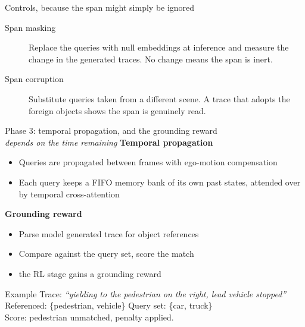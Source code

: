 \documentclass[aspectratio=169,11pt,t]{beamer}
\begin{document}
\begin{frame}{Controls, because the span might simply be ignored}
  \vspace{0.7em}
  \begin{description}
    \item[Span masking] Replace the queries with null embeddings at
      inference and measure the change in the generated traces. No change means
      the span is inert.
    \item[Span corruption] Substitute queries taken from a different scene. A
      trace that adopts the foreign objects shows the span is genuinely read.
  \end{description}
\end{frame}


\begin{frame}{Phase 3: temporal propagation, and the grounding reward \\
  \hfill\normalfont\footnotesize\itshape depends on the time remaining}
  \small
  \vspace{-0.5em}
  \textbf{Temporal propagation}
  \begin{itemize}
    \item Queries are propagated between frames with ego-motion compensation
    \item Each query keeps a FIFO memory bank of its own past states, attended
          over by temporal cross-attention \cite{Gu2023ViP3D}
  \end{itemize}

  \textbf{Grounding reward}
  \begin{itemize}
    \item Parse model generated trace for object references
    \item Compare against the query set, score the match
    \item the RL stage gains a \alert{grounding reward}
  \end{itemize}

  \vspace{-0.5em}
  \begin{exampleblock}{Example}
    \footnotesize
    Trace: \emph{``yielding to the pedestrian on the right, lead vehicle
    stopped''}\\
    Referenced: \{pedestrian, vehicle\} \qquad
    Query set: \{car, truck\}\\
    Score: pedestrian unmatched, penalty applied.
  \end{exampleblock}

\end{frame}
\end{document}
